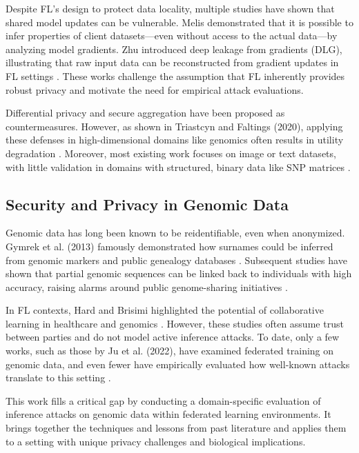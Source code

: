 \documentclass[conference]{IEEEtran}
\begin{document}
Despite FL’s design to protect data locality, multiple studies have shown that shared model updates can be vulnerable. Melis demonstrated that it is possible to infer properties of client datasets—even without access to the actual data—by analyzing model gradients\cite{hasan2023security19}. Zhu introduced deep leakage from gradients (DLG), illustrating that raw input data can be reconstructed from gradient updates in FL settings \cite{fei2023morethan20}. These works challenge the assumption that FL inherently provides robust privacy and motivate the need for empirical attack evaluations.

Differential privacy and secure aggregation have been proposed as countermeasures. However, as shown in Triastcyn and Faltings (2020), applying these defenses in high-dimensional domains like genomics often results in utility degradation \cite{momin2022generalized21}\cite{efficacy2024offederated10}\cite{gosselin2022privacy27}. Moreover, most existing work focuses on image or text datasets, with little validation in domains with structured, binary data like SNP matrices \cite{efficacy2024offederated10}\cite{kokje2020privacy25}.

\subsection{Security and Privacy in Genomic Data}

Genomic data has long been known to be reidentifiable, even when anonymized. Gymrek et al. (2013) famously demonstrated how surnames could be inferred from genomic markers and public genealogy databases \cite{melissa2013identify24}. Subsequent studies have shown that partial genomic sequences can be linked back to individuals with high accuracy, raising alarms around public genome-sharing initiatives \cite{Venkatesaramani_2021_22}.

In FL contexts, Hard and Brisimi highlighted the potential of collaborative learning in healthcare and genomics \cite{efficacy2024offederated10}\cite{kokje2020privacy25}. However, these studies often assume trust between parties and do not model active inference attacks. To date, only a few works, such as those by Ju et al. (2022), have examined federated training on genomic data, and even fewer have empirically evaluated how well-known attacks translate to this setting \cite{efficacy2024offederated10}\cite{kokje2020privacy25}.

This work fills a critical gap by conducting a domain-specific evaluation of inference attacks on genomic data within federated learning environments. It brings together the techniques and lessons from past literature and applies them to a setting with unique privacy challenges and biological implications.
\end{document}
